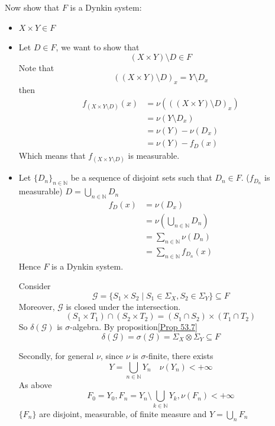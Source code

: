 \documentclass{book}
\begin{document}
Now show that $F$ is a Dynkin system:
\begin{itemize}
    \item $X\times Y\in F$
    \item Let $D\in F$, we want to show that $$(X\times Y)\setminus D\in F$$
    Note that $$((X\times Y)\setminus D)_x=Y\setminus D_x$$
    then 
    $$\begin{aligned}
        f_{(X\times Y\setminus D)}(x) &=\nu(((X\times Y)\setminus D)_x)\\
        &=\nu(Y\setminus D_x)\\
        &=\nu(Y)-\nu(D_x)\\
        &=\nu(Y)-f_D(x)
    \end{aligned}$$
    Which means that $f_{(X\times Y\setminus D)}$ is measurable.
    \item Let $\{D_n\}_{n\in \mathbb{N}}$ be a sequence of disjoint sets such that $D_n\in F$. ($f_{D_n}$ is measurable) $D=\bigcup\limits_{n\in \mathbb{N}}D_n$
    $$\begin{aligned}
    f_D(x)&=\nu(D_x)\\
    &=\nu(\bigcup\limits_{n\in \mathbb{N}}D_n)\\
    &=\sum\limits_{n\in \mathbb{N}}\nu(D_n)\\
    &=\sum\limits_{n\in \mathbb{N}}f_{D_n}(x)
    \end{aligned}$$
    Hence $F$ is a Dynkin system.

    Consider$$\mathcal{G}=\{S_1\times S_2\mid S_1\in \Sigma_X,S_2\in \Sigma_Y\}\subseteq F$$
    Moreover, $\mathcal{G}$ is closed under the intersection.
    $$(S_1\times T_1)\cap(S_2\times T_2)=(S_1\cap S_2)\times(T_1\cap T_2)$$
    So $\delta(\mathcal{G})$ is $\sigma$-algebra. By proposition\ref{Prop 53.7}
    $$\delta(\mathcal{G})=\sigma(\mathcal{G})=\Sigma_X\otimes\Sigma_Y\subseteq F$$

    Secondly, for general $\nu$, since $\nu$ is $\sigma$-finite, there exists $$Y=\bigcup\limits_{n\in \mathbb{N}}Y_n\quad \nu(Y_n)<+\infty$$
    As above$$F_0=Y_0,F_n=Y_n\setminus\bigcup\limits_{k\in \mathbb{N}}Y_k,\nu(F_n)<+\infty$$
    $\{F_n\}$ are disjoint, measurable, of finite measure and $Y=\bigcup\limits_n F_n$


\end{itemize}
\end{document}
